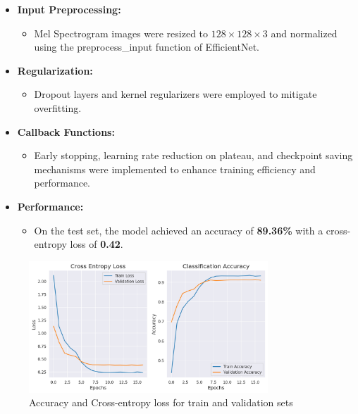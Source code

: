 \begin{itemize}
    \item \textbf{Input Preprocessing:}  
    \begin{itemize}
        \item Mel Spectrogram images were resized to \(128 \times 128 \times 3\) and normalized using the preprocess\_input function of EfficientNet.  
    \end{itemize}

    \item \textbf{Regularization:}  
    \begin{itemize}
        \item Dropout layers and kernel regularizers were employed to mitigate overfitting.  
    \end{itemize}

    \item \textbf{Callback Functions:}  
    \begin{itemize}
        \item Early stopping, learning rate reduction on plateau, and checkpoint saving mechanisms were implemented to enhance training efficiency and performance.  
    \end{itemize}

    \item \textbf{Performance:}  
    \begin{itemize}
        \item On the test set, the model achieved an accuracy of \textbf{89.36\%} with a cross-entropy loss of \textbf{0.42}.  
    \end{itemize}
\end{itemize}


\begin{figure}[h!]
    \centering
    \includegraphics[width=0.8\textwidth]{images/accuracy_and_loss.png}
    \caption{Accuracy and Cross-entropy loss for train and validation sets}
    \label{fig:visualization}
\end{figure}


